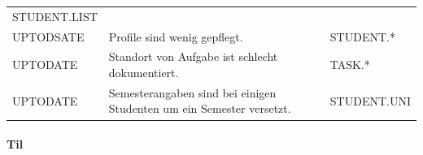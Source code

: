 \documentclass[
  12pt,
  ngerman,
  a4paper,
]{article}
\let\oldparagraph\paragraph
\renewcommand{\paragraph}[1]{\oldparagraph{#1}\mbox{}}
\begin{document}
\begin{longtable}[]{@{}lll@{}}
\begin{minipage}[t]{0.27\columnwidth}
STUDENT.LIST\strut
\end{minipage}\tabularnewline
\begin{minipage}[t]{0.15\columnwidth}\raggedright
UPTODSATE\strut
\end{minipage} & \begin{minipage}[t]{0.49\columnwidth}\raggedright
Profile sind wenig gepflegt.\strut
\end{minipage} & \begin{minipage}[t]{0.27\columnwidth}\raggedright
STUDENT.*\strut
\end{minipage}\tabularnewline
\begin{minipage}[t]{0.15\columnwidth}\raggedright
UPTODATE\strut
\end{minipage} & \begin{minipage}[t]{0.49\columnwidth}\raggedright
Standort von Aufgabe ist schlecht dokumentiert.\strut
\end{minipage} & \begin{minipage}[t]{0.27\columnwidth}\raggedright
TASK.*\strut
\end{minipage}\tabularnewline
\begin{minipage}[t]{0.15\columnwidth}\raggedright
UPTODATE\strut
\end{minipage} & \begin{minipage}[t]{0.49\columnwidth}\raggedright
Semesterangaben sind bei einigen Studenten um ein Semester
versetzt.\strut
\end{minipage} & \begin{minipage}[t]{0.27\columnwidth}\raggedright
STUDENT.UNI\strut
\end{minipage}\tabularnewline
\bottomrule
\end{longtable}

\hypertarget{til}{%
\paragraph{Til}\label{til}}
\end{document}
